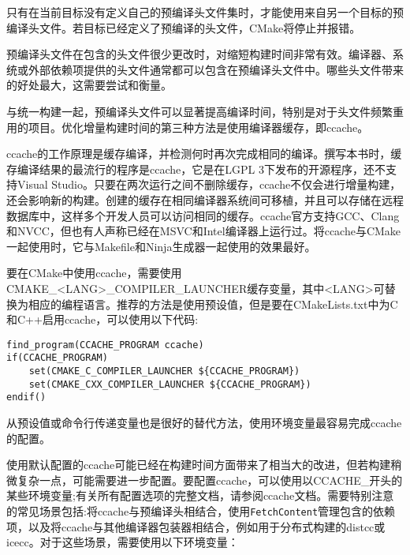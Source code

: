只有在当前目标没有定义自己的预编译头文件集时，才能使用来自另一个目标的预编译头文件。若目标已经定义了预编译的头文件，CMake将停止并报错。

预编译头文件在包含的头文件很少更改时，对缩短构建时间非常有效。编译器、系统或外部依赖项提供的头文件通常都可以包含在预编译头文件中。哪些头文件带来的好处最大，这需要尝试和衡量。

与统一构建一起，预编译头文件可以显著提高编译时间，特别是对于头文件频繁重用的项目。优化增量构建时间的第三种方法是使用编译器缓存，即ccache。


ccache的工作原理是缓存编译，并检测何时再次完成相同的编译。撰写本书时，缓存编译结果的最流行的程序是ccache，它是在LGPL 3下发布的开源程序，还不支持Visual Studio。只要在两次运行之间不删除缓存，ccache不仅会进行增量构建，还会影响新的构建。创建的缓存在相同编译器系统间可移植，并且可以存储在远程数据库中，这样多个开发人员可以访问相同的缓存。ccache官方支持GCC、Clang和NVCC，但也有人声称已经在MSVC和Intel编译器上运行过。将ccache与CMake一起使用时，它与Makefile和Ninja生成器一起使用的效果最好。

要在CMake中使用ccache，需要使用CMAKE\_<LANG>\_COMPILER\_LAUNCHER缓存变量，其中<LANG>可替换为相应的编程语言。推荐的方法是使用预设值，但是要在CMakeLists.txt中为C和C++启用ccache，可以使用以下代码:

\begin{lstlisting}[style=styleCMake]
find_program(CCACHE_PROGRAM ccache)
if(CCACHE_PROGRAM)
	set(CMAKE_C_COMPILER_LAUNCHER ${CCACHE_PROGRAM})
	set(CMAKE_CXX_COMPILER_LAUNCHER ${CCACHE_PROGRAM})
endif()
\end{lstlisting}

从预设值或命令行传递变量也是很好的替代方法，使用环境变量最容易完成ccache的配置。

使用默认配置的ccache可能已经在构建时间方面带来了相当大的改进，但若构建稍微复杂一点，可能需要进一步配置。要配置ccache，可以使用以CCACHE\_开头的某些环境变量;有关所有配置选项的完整文档，请参阅ccache文档。需要特别注意的常见场景包括:将ccache与预编译头相结合，使用\texttt{FetchContent}管理包含的依赖项，以及将ccache与其他编译器包装器相结合，例如用于分布式构建的distcc或icecc。对于这些场景，需要使用以下环境变量：


